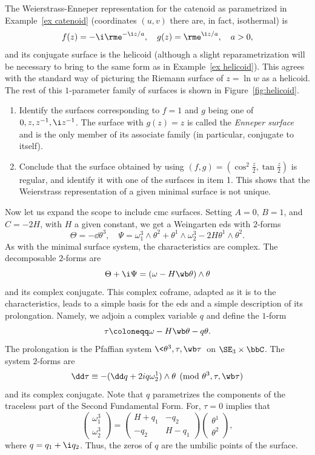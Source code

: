 \begin{example}
    The Weierstrass-Enneper representation for the catenoid as parametrized in Example~\ref{ex catenoid} (coordinates $(u,v)$ there are, in fact, isothermal) is 
    \[f(z)=-\i \rme^{-\i z/a},\quad g(z)=\rme^{\i z/a},\quad a>0,\]
    and its conjugate surface is the helicoid (although a slight reparametrization will be necessary to bring to the same form as in Example~\ref{ex helicoid}). This agrees with the standard way of picturing the Riemann surface of $z=\ln w$ as a helicoid. The rest of this $1$-parameter family of surfaces is shown in Figure~\ref{fig:helicoid}.
\end{example}


\begin{xca}
    \begin{enumerate}
        \item Identify the surfaces corresponding to $f=1$ and $g$ being one of $0,z,z^{-1},\i z^{-1}$. The surface with $g(z)=z$ is called the \emph{Enneper surface} and is the only member of its associate family (in particular, conjugate to itself).
        \item Conclude that the surface obtained by using $(f,g)=(\cos^2\frac{z}{2},\tan\frac{z}{2})$ is regular, and identify it with one of the surfaces in item 1. This shows that the Weierstrass representation of a given minimal surface is not unique.
    \end{enumerate}
\end{xca}

Now let us expand the scope to include \gls{cmc} surfaces. Setting $A=0$, $B=1$, and $C=-2H$, with $H$ a given constant, we get a Weingarten \gls{eds} with $2$-forms 
\[\Theta=-\dd\theta^3,\quad \Psi=\omega^3_1\wedge\theta^2+\theta^1\wedge\omega^3_2-2H\theta^1\wedge\theta^2.\]
As with the minimal surface system, the characteristics are complex. The decomposable $2$-forms are 
\[\Theta+ \i \Psi=(\omega-H\wb\theta)\wedge\theta\]
and its complex conjugate. This complex coframe, adapted as it is to the characteristics, leads to a simple basis for the \gls{eds} and a simple description of its prolongation. Namely, we adjoin a complex variable $q$ and define the $1$-form 
\[\tau\coloneqq \omega-H\wb\theta-q\theta.\]
The prolongation is the Pfaffian system $\<\theta^3,\tau,\wb\tau\>$ on $\SE_3\times\bbC$. The system $2$-forms are 
\[\dd\tau\equiv -(\dd q+2iq\omega^1_2)\wedge\theta\pmod{\theta^3,\tau,\wb\tau}\]
and its complex conjugate. Note that $q$ parametrizes the components of the traceless part of the Second Fundamental Form. For, $\tau=0$ implies that 
\[\begin{pmatrix}
    \omega^3_1\\\omega^3_2
\end{pmatrix}=\begin{pmatrix}
    H+q_1 & -q_2\\
    -q_2 & H-q_1
\end{pmatrix}\begin{pmatrix}
    \theta^1\\\theta^2
\end{pmatrix},\]
where $q=q_1+\i q_2$. Thus, the zeros of $q$ are the umbilic points of the surface.

